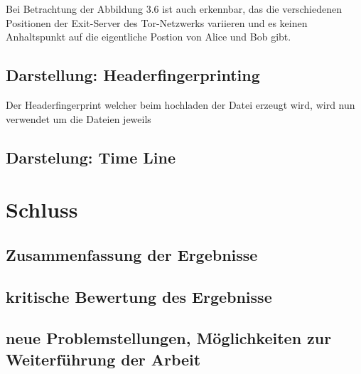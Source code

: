 \documentclass[
    fontsize=12pt,
    headings=small,
    parskip=half,           %
    bibliography=totoc,
    numbers=noenddot,       %
    open=any,               %
    ]{scrreprt}
\begin{document}
Bei Betrachtung der Abbildung 3.6 ist auch erkennbar, das die verschiedenen Positionen der Exit-Server des Tor-Netzwerks variieren und es keinen Anhaltspunkt auf die eigentliche Postion von Alice und Bob gibt. 

 





\section{Darstellung: Headerfingerprinting}

Der Headerfingerprint welcher beim hochladen der Datei erzeugt wird, wird nun verwendet um die Dateien jeweils  

\section{Darstelung: Time Line}

\chapter{Schluss}

\section{Zusammenfassung der Ergebnisse}
\section{kritische Bewertung des Ergebnisse}
\section{neue Problemstellungen, Möglichkeiten zur Weiterführung der Arbeit}
\end{document}
